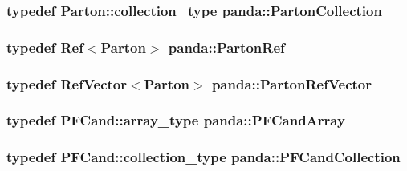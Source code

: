 \label{namespacepanda_a4b45a509f15ea6c03f31cfe3b60c649c}
\hypertarget{namespacepanda_a74b06d43d55cb73964b16fdba8c41dfa}{
\subsubsection[{PartonCollection}]{\setlength{\rightskip}{0pt plus 5cm}typedef {\bf Parton::collection\_\-type} {\bf panda::PartonCollection}}}
\label{namespacepanda_a74b06d43d55cb73964b16fdba8c41dfa}
\hypertarget{namespacepanda_a7cb499321c395ab6cd0b8b8354cf6c9b}{
\subsubsection[{PartonRef}]{\setlength{\rightskip}{0pt plus 5cm}typedef {\bf Ref}$<${\bf Parton}$>$ {\bf panda::PartonRef}}}
\label{namespacepanda_a7cb499321c395ab6cd0b8b8354cf6c9b}
\hypertarget{namespacepanda_ae5c73375c0b1ea59cda1767e3ee94446}{
\subsubsection[{PartonRefVector}]{\setlength{\rightskip}{0pt plus 5cm}typedef {\bf RefVector}$<${\bf Parton}$>$ {\bf panda::PartonRefVector}}}
\label{namespacepanda_ae5c73375c0b1ea59cda1767e3ee94446}
\hypertarget{namespacepanda_aed16d5b918c5d47b599d6d879da8b5aa}{
\subsubsection[{PFCandArray}]{\setlength{\rightskip}{0pt plus 5cm}typedef {\bf PFCand::array\_\-type} {\bf panda::PFCandArray}}}
\label{namespacepanda_aed16d5b918c5d47b599d6d879da8b5aa}
\hypertarget{namespacepanda_a0ca34b0773035be0526701d0b93426e2}{
\subsubsection[{PFCandCollection}]{\setlength{\rightskip}{0pt plus 5cm}typedef {\bf PFCand::collection\_\-type} {\bf panda::PFCandCollection}}}
